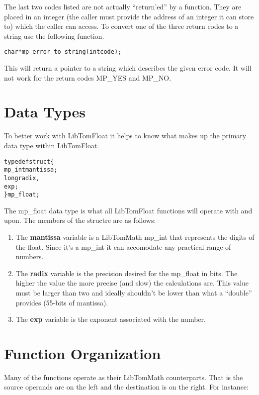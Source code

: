 \documentclass[b5paper]{book}
\begin{document}
The last two codes listed are not actually ``return'ed'' by a function.  They are placed in an integer (the caller must
provide the address of an integer it can store to) which the caller can access.  To convert one of the three return codes
to a string use the following function.

\begin{alltt}
char *mp_error_to_string(int code);
\end{alltt}

This will return a pointer to a string which describes the given error code.  It will not work for the return codes 
MP\_YES and MP\_NO.  

\section{Data Types}

To better work with LibTomFloat it helps to know what makes up the primary data type within LibTomFloat.

\begin{alltt}
typedef struct \{
     mp_int mantissa;
     long   radix,
            exp;
\} mp_float;
\end{alltt}

The mp\_float data type is what all LibTomFloat functions will operate with and upon.  The members of the structre are as follows:

\begin{enumerate}
   \item The \textbf{mantissa} variable is a LibTomMath mp\_int that represents the digits of the float.  Since it's a mp\_int it can accomodate
         any practical range of numbers.
   \item The \textbf{radix} variable is the precision desired for the mp\_float in bits.  The higher the value the more precise (and slow) the 
         calculations are.  This value must be larger than two and ideally shouldn't be lower than what a ``double'' provides (55-bits of mantissa).
   \item The \textbf{exp} variable is the exponent associated with the number.  
\end{enumerate}

\section{Function Organization}

Many of the functions operate as their LibTomMath counterparts.  That is the source operands are on the left and the destination is on the 
right.  For instance:
\end{document}
